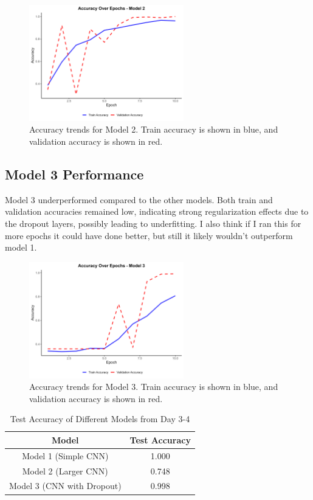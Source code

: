 \documentclass{article}
\begin{document}
\begin{figure}[H]
    \centering
    \includegraphics[width=0.6\textwidth]{../results/accuracy_plot_model_2.png}
    \caption{Accuracy trends for Model 2. Train accuracy is shown in blue, and validation accuracy is shown in red.}
    \label{fig:model2}
\end{figure}

\subsection{Model 3 Performance}
Model 3 underperformed compared to the other models. Both train and validation accuracies remained low, indicating strong regularization effects due to the dropout layers, possibly leading to underfitting. I also think if I ran this for more epochs it could have done better, but still it likely wouldn't outperform model 1. 

\begin{figure}[h!]
    \centering
    \includegraphics[width=0.6\textwidth]{../results/accuracy_plot_model_3.png}
    \caption{Accuracy trends for Model 3. Train accuracy is shown in blue, and validation accuracy is shown in red.}
    \label{fig:model3}
\end{figure}


\begin{table}[H]
\centering
\caption{Test Accuracy of Different Models from Day 3-4}
\label{tab:model_accuracy}
\begin{tabular}{|c|c|}
\hline
\textbf{Model} & \textbf{Test Accuracy} \\ \hline
Model 1 (Simple CNN)       & 1.000       \\ \hline
Model 2 (Larger CNN)       & 0.748       \\ \hline
Model 3 (CNN with Dropout) & 0.998       \\ \hline
\end{tabular}
\end{table}
\end{document}
